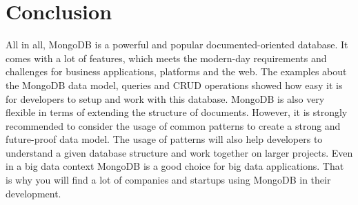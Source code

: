 \section{Conclusion}
All in all, MongoDB is a powerful and popular documented-oriented database. It comes with a lot of features, which meets the modern-day requirements and challenges for business applications, platforms and the web. 
The examples about the MongoDB data model, queries and CRUD operations showed how easy it is for developers to setup and work with this database. MongoDB is also very flexible in terms of extending the structure of documents. However, it is strongly recommended to consider the usage of common patterns to create a strong and future-proof data model. The usage of patterns will also help developers to understand a given database structure and work together on larger projects.
Even in a big data context MongoDB is a good choice for big data applications. That is why you will find a lot of companies and startups using MongoDB in their development.

